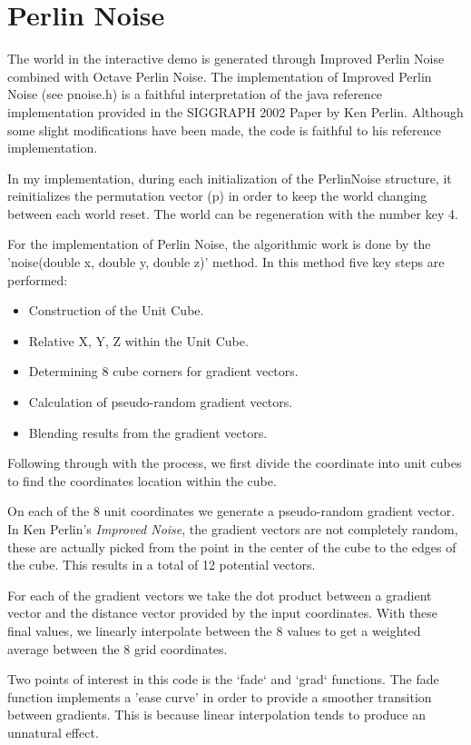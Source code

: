 \documentclass{book}
\begin{document}
\section{Perlin Noise}
The world in the interactive demo is generated through Improved Perlin Noise combined with Octave Perlin Noise.  The implementation of Improved Perlin Noise (see pnoise.h) is a faithful interpretation of the java reference implementation provided in the SIGGRAPH 2002 Paper by Ken Perlin.  Although some slight modifications have been made, the code is faithful to his reference implementation.
    
In my implementation, during each initialization of the PerlinNoise structure, it reinitializes the permutation vector (p) in order to keep the world changing between each world reset.  The world can be regeneration with the number key 4.
    
For the implementation of Perlin Noise, the algorithmic work is done by the 'noise(double x, double y, double z)' method.  In this method five key steps are performed:
    
\begin{itemize}
	\item Construction of the Unit Cube.
	\item Relative X, Y, Z within the Unit Cube.
	\item Determining 8 cube corners for gradient vectors.
	\item Calculation of pseudo-random gradient vectors.
	\item Blending results from the gradient vectors.
\end{itemize}
  
Following through with the process, we first divide the coordinate into unit cubes to find the coordinates location within the cube.
    
On each of the 8 unit coordinates we generate a pseudo-random gradient vector.  In Ken Perlin's \textit{Improved Noise}, the gradient vectors are not completely random, these are actually picked from the point in the center of the cube to the edges of the cube.  This results in a total of 12 potential vectors.
    
For each of the gradient vectors we take the dot product between a gradient vector and the distance vector provided by the input coordinates.  With these final values, we linearly interpolate between the 8 values to get a weighted average between the 8 grid coordinates.  
    
Two points of interest in this code is the `fade` and `grad` functions.  The fade function implements a 'ease curve' in order to provide a smoother transition between gradients.  This is because linear interpolation tends to produce an unnatural effect.
    
\end{document}
